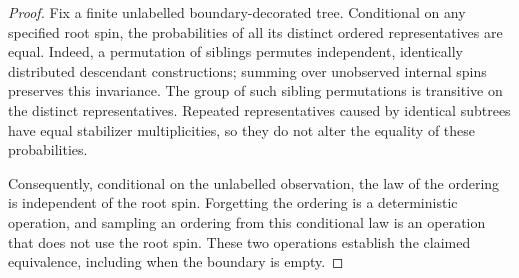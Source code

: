 \begin{proof}
Fix a finite unlabelled boundary-decorated tree.  Conditional on any
specified root spin, the probabilities of all its distinct ordered
representatives are equal.  Indeed, a permutation of siblings permutes
independent, identically distributed descendant constructions; summing
over unobserved internal spins preserves this invariance.  The group of
such sibling permutations is transitive on the distinct representatives.
Repeated representatives caused by identical subtrees have equal
stabilizer multiplicities, so they do not alter the equality of these
probabilities.

Consequently, conditional on the unlabelled observation, the law of the
ordering is independent of the root spin.  Forgetting the ordering is a
deterministic operation, and sampling an ordering from this conditional
law is an operation that does not use the root spin.  These two operations
establish the claimed equivalence, including when the boundary is empty.
\end{proof}

